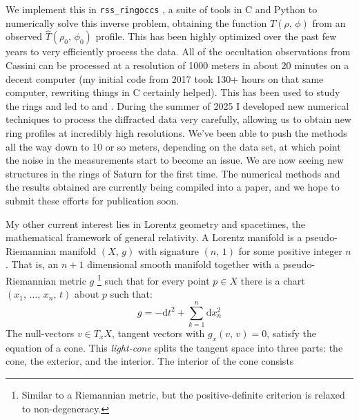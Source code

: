 \documentclass{article}
\begin{document}
        We implement this in \texttt{rss\_ringoccs}
        \cite{rssringoccs}, a suite of tools in C and
        Python to numerically solve this inverse problem,
        obtaining the function $T(\rho,\,\phi)$ from an observed
        $\hat{T}(\rho_{0},\,\phi_{0})$ profile. This has been
        highly optimized over the past few years to very efficiently
        process the data. All of the occultation observations from Cassini
        can be processed at a resolution of 1000 meters in about 20 minutes on a
        decent computer (my initial code from 2017 took 130+
        hours on that same computer, rewriting things in C certainly helped).
        This has been used to study the rings and led to
        \cite{FRENCH2023115678} and \cite{NICHOLSON2023115287}.
        During the summer of 2025 I developed new numerical techniques to
        process the diffracted data very carefully, allowing us to obtain new
        ring profiles at incredibly high resolutions. We've been able to push
        the methods all the way down to 10 or so meters, depending on the
        data set, at which point the noise in the measurements start to become
        an issue. We are now seeing new
        structures in the rings of Saturn for the first time. The numerical
        methods and the results obtained are currently being compiled into a
        paper, and we hope to submit these efforts for publication soon.
        \par\hfill\par
        My other current interest lies in Lorentz geometry and spacetimes,
        the mathematical framework of general relativity. A Lorentz manifold
        is a pseudo-Riemannian manifold $(X,\,g)$ with signature $(n,\,1)$ for
        some positive integer $n$. That is, an $n+1$ dimensional smooth
        manifold together with a pseudo-Riemannian metric $g$%
        \footnote{
            Similar to a Riemannian metric, but the positive-definite
            criterion is relaxed to non-degeneracy.
        }
        such that for every point $p\in{X}$ there is a chart
        $(x_{1},\,\dots,\,x_{n},\,t)$ about $p$ such that:
        \begin{equation}
            g=-\textrm{d}t^{2}+\sum_{k=1}^{n}\textrm{d}x_{n}^{2}
        \end{equation}
        The null-vectors $v\in{T}_{x}X$, tangent vectors with
        $g_{x}(v,\,v)=0$, satisfy the equation of a cone. This
        \textit{light-cone} splits the tangent space into three parts: the
        cone, the exterior, and the interior. The interior of the cone consists
\end{document}
